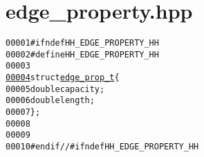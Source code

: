 \hypertarget{edge__property_8hpp_source}{
\section{edge\_\-property.hpp}
}


\begin{footnotesize}\begin{alltt}
00001 \textcolor{preprocessor}{#ifndef HH\_EDGE\_PROPERTY\_HH}
00002 \textcolor{preprocessor}{}\textcolor{preprocessor}{#define HH\_EDGE\_PROPERTY\_HH}
00003 \textcolor{preprocessor}{}
\hypertarget{edge__property_8hpp_source_l00004}{}\hyperlink{structedge__prop__t}{00004} \textcolor{keyword}{struct }\hyperlink{structedge__prop__t}{edge_prop_t}\{
00005         \textcolor{keywordtype}{double} capacity;
00006         \textcolor{keywordtype}{double} length;
00007 \};
00008 
00009 
00010 \textcolor{preprocessor}{#endif //#ifndef HH\_EDGE\_PROPERTY\_HH}
\end{alltt}\end{footnotesize}
